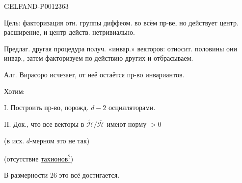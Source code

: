 \begin{GelfandAdjacentEvidence}{GELFAND-P001236}{3}


Цель: факторизация отн. группы диффеом. во всём пр-ве, но действует центр. расширение, и центр действ. нетривиально.

Предлаг. другая процедура получ. «инвар.» векторов: относит. половины они инвар., затем факторизуем по действию других и отбрасываем.

Алг. Вирасоро исчезает, от неё остаётся пр-во инвариантов.

Хотим:

I. Построить пр-во, порожд. $d-2$ осцилляторами.

II. Док., что все векторы в $\widetilde{\mathcal H}/\overline{\mathcal H}$ имеют норму $>0$

(в исх. $d$-мерном это не так)

(отсутствие \underline{тахионов\textsuperscript{?}})
\end{GelfandAdjacentEvidence}


В размерности 26 это всё достигается.


